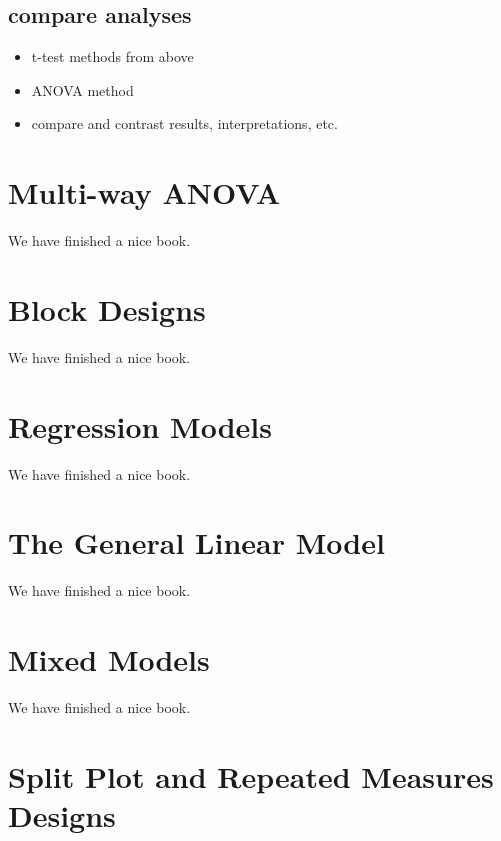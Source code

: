 \documentclass[
]{book}
\providecommand{\tightlist}{%
  \setlength{\itemsep}{0pt}\setlength{\parskip}{0pt}}
\theoremstyle{definition}
\theoremstyle{definition}
\theoremstyle{definition}
\theoremstyle{remark}
\begin{document}
\hypertarget{compare-analyses}{%
\section{compare analyses}\label{compare-analyses}}

\begin{itemize}
\tightlist
\item
  t-test methods from above
\item
  ANOVA method
\item
  compare and contrast results, interpretations, etc.
\end{itemize}

\hypertarget{multiway}{%
\chapter{Multi-way ANOVA}\label{multiway}}

We have finished a nice book.

\hypertarget{block}{%
\chapter{Block Designs}\label{block}}

We have finished a nice book.

\hypertarget{regression}{%
\chapter{Regression Models}\label{regression}}

We have finished a nice book.

\hypertarget{glm}{%
\chapter{The General Linear Model}\label{glm}}

We have finished a nice book.

\hypertarget{mixedmodels}{%
\chapter{Mixed Models}\label{mixedmodels}}

We have finished a nice book.

\hypertarget{repeatedmeasures}{%
\chapter{Split Plot and Repeated Measures Designs}\label{repeatedmeasures}}
\end{document}
